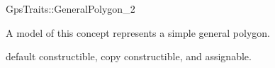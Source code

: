 \ccRefPageBegin


\begin{ccRefConcept}{GpsTraits::GeneralPolygon_2}


\ccDefinition
A model of this concept represents a simple general polygon.

\ccRefines
default constructible, copy constructible, and assignable. 

\ccGeneralizes

%

\ccHasModels

\ccSeeAlso

\end{ccRefConcept}

\ccRefPageEnd


